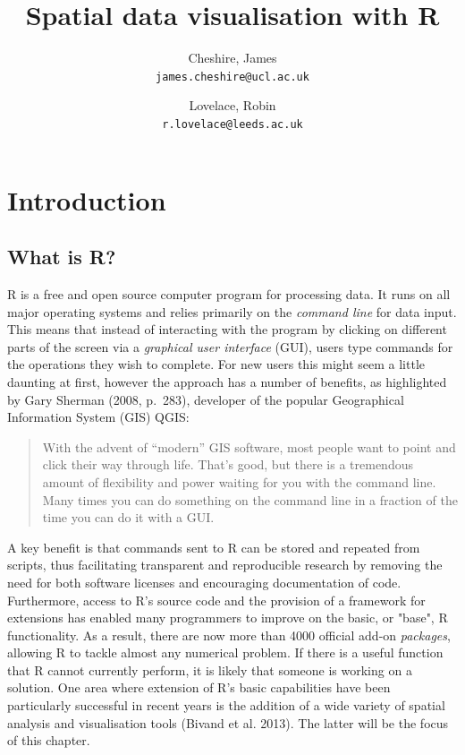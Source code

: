 \documentclass[]{article}
\begin{document}
\author{
Cheshire, James\\
\texttt{james.cheshire@ucl.ac.uk}
\and
Lovelace, Robin\\
\texttt{r.lovelace@leeds.ac.uk}
}
\title{Spatial data visualisation with R}

\maketitle
\section{Introduction}

\subsection{What is R?}

R is a free and open source computer program for
processing data. It runs on all major operating systems and
relies primarily on the \emph{command line} for
data input. This means that instead of interacting with the program by
clicking on different parts of the screen via a \emph{graphical user
interface} (GUI), users type commands for the operations they wish to
complete. For new users this might seem a little daunting at first, however the approach has a
number of benefits, as highlighted by Gary Sherman (2008, p.~283),
developer of the popular Geographical Information System (GIS) QGIS:

\begin{quote}
With the advent of ``modern'' GIS software, most people want to point
and click their way through life. That's good, but there is a tremendous
amount of flexibility and power waiting for you with the command line.
Many times you can do something on the command line in a fraction of the
time you can do it with a GUI.
\end{quote}

A key benefit is that commands sent to R
can be stored and repeated from scripts, thus facilitating transparent and reproducible research by
removing the need for both software licenses and encouraging
documentation of code. Furthermore, access to R's source code and the provision of a framework for extensions
has enabled many programmers to improve on the basic, or "base", R functionality. As a result, there are now more
than 4000 official add-on \emph{packages}, allowing R to tackle
almost any numerical problem. If there is a useful function that R
cannot currently perform, it is likely that someone is working
on a solution. One area where
extension of R's basic capabilities have been particularly successful in
recent years is the addition of a wide variety of spatial analysis and
visualisation tools (Bivand et al. 2013). The latter will be the focus
of this chapter.
\end{document}

